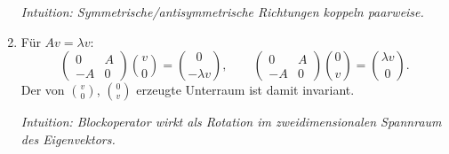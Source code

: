 \documentclass[11pt, a4paper]{article}
\begin{document}
\begin{enumerate}
  \medskip\noindent\textit{Intuition: Symmetrische/antisymmetrische Richtungen koppeln paarweise.}

  \item
  Für $Av=\lambda v$:
  \[
    \begin{pmatrix}0&A\\-A&0\end{pmatrix}\!\binom{v}{0}
      =\binom{0}{-\lambda v},\qquad
    \begin{pmatrix}0&A\\-A&0\end{pmatrix}\!\binom{0}{v}
      =\binom{\lambda v}{0}.
  \]
  Der von $\binom{v}{0}$, $\binom{0}{v}$ erzeugte Unterraum ist damit invariant.

  \medskip\noindent\textit{Intuition: Blockoperator wirkt als Rotation im zweidimensionalen Spannraum des Eigenvektors.}
\end{enumerate}
\end{document}
